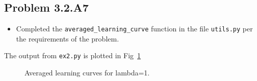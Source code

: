 \documentclass{article}
\begin{document}
\subsection{Problem 3.2.A7}
\begin{itemize}
\item Completed the \verb|averaged_learning_curve| function in the file \verb|utils.py| per the requirements of the problem.
\end{itemize}
The output from \verb|ex2.py| is plotted in Fig~\ref{fig:11}
\begin{figure}[h]
  \caption{Averaged learning curves for lambda=1.}\label{fig:11}
\end{figure}
\end{document}

